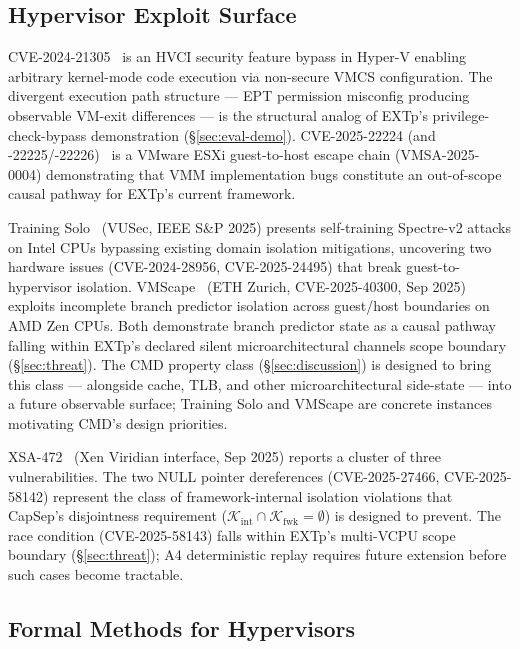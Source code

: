 \documentclass[conference]{IEEEtran}
\newcommand{\Kint}{\mathcal{K}_\text{int}}
\newcommand{\Kfwk}{\mathcal{K}_\text{fwk}}
\begin{document}
\subsection{Hypervisor Exploit Surface}

CVE-2024-21305~\cite{tandasat2024hvci} is an HVCI security feature
bypass in Hyper-V enabling arbitrary kernel-mode code execution via
non-secure VMCS configuration. The divergent execution path
structure --- EPT permission misconfig producing observable VM-exit
differences --- is the structural analog of EXTp's
privilege-check-bypass demonstration (\S\ref{sec:eval-demo}).
CVE-2025-22224 (and -22225/-22226)~\cite{broadcom2025vmsa} is a
VMware ESXi guest-to-host escape chain (VMSA-2025-0004) demonstrating
that VMM implementation bugs constitute an out-of-scope causal
pathway for EXTp's current framework.

Training Solo~\cite{barberis2025trainingsolo} (VUSec, IEEE S\&P
2025) presents self-training Spectre-v2 attacks on Intel CPUs
bypassing existing domain isolation mitigations, uncovering two
hardware issues (CVE-2024-28956, CVE-2025-24495) that break
guest-to-hypervisor isolation. VMScape~\cite{vmscape2025} (ETH
Zurich, CVE-2025-40300, Sep 2025) exploits incomplete branch
predictor isolation across guest/host boundaries on AMD Zen CPUs.
Both demonstrate branch predictor state as a causal pathway falling
within EXTp's declared silent microarchitectural channels scope
boundary (\S\ref{sec:threat}). The CMD property class
(\S\ref{sec:discussion}) is designed to bring this class ---
alongside cache, TLB, and other microarchitectural side-state ---
into a future observable surface; Training Solo and VMScape are
concrete instances motivating CMD's design priorities.

XSA-472~\cite{xsa472} (Xen Viridian interface, Sep 2025) reports a
cluster of three vulnerabilities. The two NULL pointer dereferences
(CVE-2025-27466, CVE-2025-58142) represent the class of
framework-internal isolation violations that CapSep's disjointness
requirement ($\Kint \cap \Kfwk = \emptyset$) is designed to prevent.
The race condition (CVE-2025-58143) falls within EXTp's multi-VCPU
scope boundary (\S\ref{sec:threat}); A4 deterministic replay
requires future extension before such cases become tractable.

\subsection{Formal Methods for Hypervisors}
\end{document}
